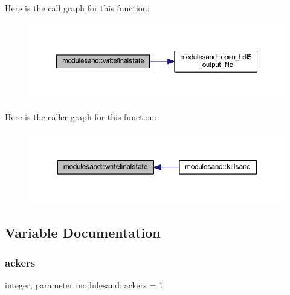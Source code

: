 Here is the call graph for this function\+:\nopagebreak
\begin{figure}[H]
\begin{center}
\leavevmode
\includegraphics[width=350pt]{namespacemodulesand_afb972f404f3d402212f2af24b34ddb90_cgraph}
\end{center}
\end{figure}
Here is the caller graph for this function\+:\nopagebreak
\begin{figure}[H]
\begin{center}
\leavevmode
\includegraphics[width=350pt]{namespacemodulesand_afb972f404f3d402212f2af24b34ddb90_icgraph}
\end{center}
\end{figure}


\subsection{Variable Documentation}
\mbox{\label{namespacemodulesand_ab78f3607e7926e591afd7524d7cb1891}} 
\subsubsection{\texorpdfstring{ackers}{ackers}}
{\footnotesize\ttfamily integer, parameter modulesand\+::ackers = 1\hspace{0.3cm}{\ttfamily [private]}}

\mbox{\label{namespacemodulesand_a61791e89c9f7920fbec5dcb046279262}} 
